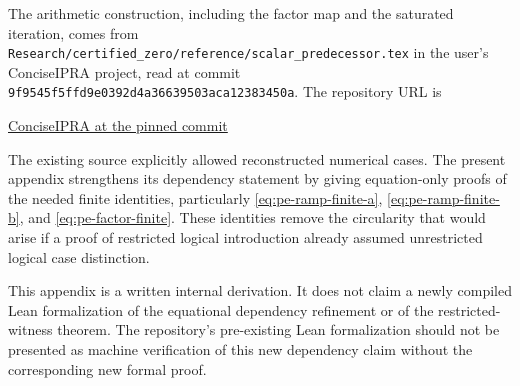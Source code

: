 The arithmetic construction, including the factor map and the saturated
iteration, comes from
\texttt{Research/certified\_zero/reference/scalar\_predecessor.tex} in the
user's ConciseIPRA project, read at commit
\texttt{9f9545f5ffd9e0392d4a36639503aca12383450a}.
The repository URL is
\begin{center}\small
\href{https://github.com/VladimirReshetnikov/ProveIt/tree/9f9545f5ffd9e0392d4a36639503aca12383450a/Logic/PrimitiveRecursiveArithmetic/ConciseIPRA}{ConciseIPRA at the pinned commit}
\end{center}
The existing source explicitly allowed reconstructed numerical cases.
The present appendix strengthens its dependency statement by giving
equation-only proofs of the needed finite identities, particularly
\eqref{eq:pe-ramp-finite-a}, \eqref{eq:pe-ramp-finite-b}, and
\eqref{eq:pe-factor-finite}.  These identities remove the circularity that
would arise if a proof of restricted logical introduction already assumed
unrestricted logical case distinction.

This appendix is a written internal derivation.  It does not claim a newly
compiled Lean formalization of the equational dependency refinement or of
the restricted-witness theorem.  The repository's pre-existing Lean
formalization should not be presented as machine verification of this
new dependency claim without the corresponding new formal proof.

